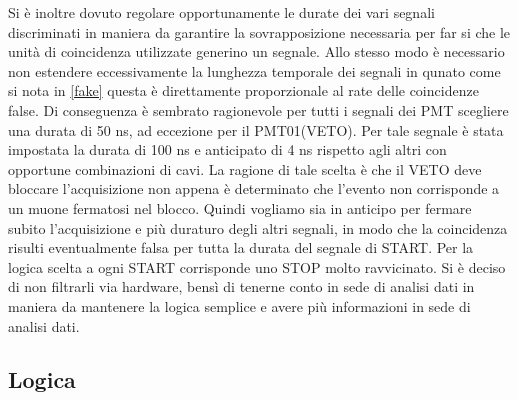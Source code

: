 \documentclass[10pt,a4paper]{article}
\begin{document}
\begin{flushleft}
\begin{itemize}
    
\end{itemize}

Si è inoltre dovuto regolare opportunamente le durate dei vari segnali discriminati in maniera da garantire la sovrapposizione necessaria per far si che le unità di coincidenza utilizzate generino un segnale. Allo stesso modo è necessario non estendere eccessivamente la lunghezza temporale dei segnali in qunato come si nota in \ref{fake} questa è direttamente proporzionale al rate delle coincidenze false. Di conseguenza è sembrato ragionevole per tutti i segnali dei PMT scegliere una durata di 50 ns, ad eccezione per il PMT01(VETO).
Per tale segnale è stata impostata la durata di 100 ns e anticipato di 4 ns rispetto agli altri con opportune combinazioni di cavi. 
La ragione di tale scelta è che il VETO deve bloccare l'acquisizione non appena è determinato che l'evento non corrisponde a un muone fermatosi nel blocco. Quindi vogliamo sia in anticipo per fermare subito l'acquisizione e più duraturo degli altri segnali, in modo che la coincidenza risulti eventualmente falsa per tutta la durata del segnale di START.
Per la logica scelta a ogni START corrisponde uno STOP molto ravvicinato. Si è deciso di non filtrarli via hardware, bensì di tenerne conto in sede di analisi dati in maniera da mantenere la logica semplice e avere più informazioni in sede di analisi dati.

\end{flushleft}

\subsection{Logica}
\end{document}
